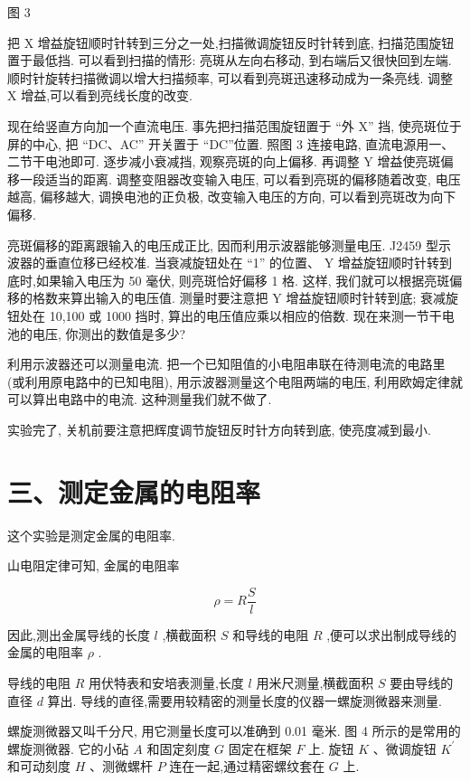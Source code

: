 \documentclass[10pt]{article}
\begin{document}
图 3

把 \(\mathrm{X}\) 增益旋钮顺时针转到三分之一处,扫描微调旋钮反时针转到底, 扫描范围旋钮置于最低挡. 可以看到扫描的情形: 亮斑从左向右移动, 到右端后又很快回到左端. 顺时针旋转扫描微调以增大扫描频率, 可以看到亮斑迅速移动成为一条亮线. 调整 \(\mathrm{X}\) 增益,可以看到亮线长度的改变.

现在给竖直方向加一个直流电压. 事先把扫描范围旋钮置于 “外 X” 挡, 使亮斑位于屏的中心, 把 “DC、AC” 开关置于 “DC”位置. 照图 3 连接电路, 直流电源用一、二节干电池即可. 逐步减小衰减挡, 观察亮斑的向上偏移. 再调整 \(\mathrm{Y}\) 增益使亮斑偏移一段适当的距离. 调整变阻器改变输入电压, 可以看到亮斑的偏移随着改变, 电压越高, 偏移越大, 调换电池的正负极, 改变输入电压的方向, 可以看到亮斑改为向下偏移.

亮斑偏移的距离跟输入的电压成正比, 因而利用示波器能够测量电压. J2459 型示波器的垂直位移已经校准. 当衰减旋钮处在 “1” 的位置、 \(\mathrm{Y}\) 增益旋钮顺时针转到底时,如果输入电压为 50 毫伏, 则亮斑恰好偏移 1 格. 这样, 我们就可以根据亮斑偏移的格数来算出输入的电压值. 测量时要注意把 \(\mathrm{Y}\) 增益旋钮顺时针转到底; 衰减旋钮处在 10,100 或 1000 挡时, 算出的电压值应乘以相应的倍数. 现在来测一节干电池的电压, 你测出的数值是多少?

利用示波器还可以测量电流. 把一个已知阻值的小电阻串联在待测电流的电路里 (或利用原电路中的已知电阻), 用示波器测量这个电阻两端的电压, 利用欧姆定律就可以算出电路中的电流. 这种测量我们就不做了.

实验完了, 关机前要注意把辉度调节旋钮反时针方向转到底, 使亮度减到最小.

\section*{三、测定金属的电阻率}

这个实验是测定金属的电阻率.

山电阻定律可知, 金属的电阻率

\[
\rho = R\frac{S}{l}
\]

因此,测出金属导线的长度 \(l\) ,横截面积 \(S\) 和导线的电阻 \(R\) ,便可以求出制成导线的金属的电阻率 \(\rho\) .

导线的电阻 \(R\) 用伏特表和安培表测量,长度 \(l\) 用米尺测量,横截面积 \(S\) 要由导线的直径 \(d\) 算出. 导线的直径,需要用较精密的测量长度的仪器一螺旋测微器来测量.

螺旋测微器又叫千分尺, 用它测量长度可以准确到 0.01 毫米. 图 4 所示的是常用的螺旋测微器. 它的小砧 \(A\) 和固定刻度 \(G\) 固定在框架 \(F\) 上. 旋钮 \(K\) 、微调旋钮 \({K}^{\prime }\) 和可动刻度 \(H\) 、测微螺杆 \(P\) 连在一起,通过精密螺纹套在 \(G\) 上.
\end{document}
